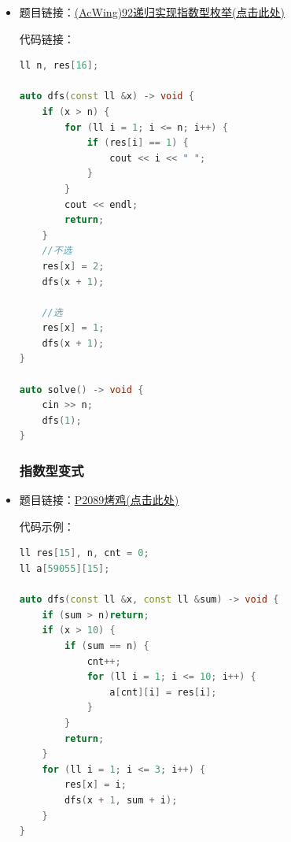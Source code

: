 \begin{itemize}
代码示例：\\
\begin{lstlisting}[language=C++]
ll n, m, res[20];

auto dfs(const ll &x, const ll &start) -> void {
	if (x > m) {
		//这里的x到底是>m还是==m取决于solve中传的x的值，1则>,0则==。
		for (ll i = 1; i <= m; i++) {
			cout << (i > 1 ? " " : "") << res[i];
		}
		cout << endl;
		return; //无论是什么类型的搜索都必须要有return;
	}
	
	for (ll i = start; i <= n; i++) {//因为组合型每次都从当前开始的位置填充，
		res[x] = i;                //所以不需要bool类型的数组        
		dfs(x + 1, start + 1);
	}
}

auto solve() -> void {
	cin >> n >> m;
	dfs(1, 1);
}
\end{lstlisting}
\subsubsection{递归实现指数型枚举}
\item 题目链接：\href{https://www.acwing.com/problem/content/94/}{(AcWing)92递归实现指数型枚举(点击此处)}

代码链接：\\
\begin{lstlisting}[language=C++]
ll n, res[16];

auto dfs(const ll &x) -> void {
	if (x > n) {
		for (ll i = 1; i <= n; i++) {
			if (res[i] == 1) {
				cout << i << " ";
			}
		}
		cout << endl;
		return;
	}
	//不选
	res[x] = 2;
	dfs(x + 1);
	
	//选
	res[x] = 1;
	dfs(x + 1);
}

auto solve() -> void {
	cin >> n;
	dfs(1);
}
\end{lstlisting}
\subsubsection{指数型变式}
\item 题目链接：\href{https://www.luogu.com.cn/problem/P2089}{P2089烤鸡(点击此处)}

代码示例：\\
\begin{lstlisting}[language=C++]
ll res[15], n, cnt = 0;
ll a[59055][15];

auto dfs(const ll &x, const ll &sum) -> void {
	if (sum > n)return;
	if (x > 10) {
		if (sum == n) {
			cnt++;
			for (ll i = 1; i <= 10; i++) {
				a[cnt][i] = res[i];
			}
		}
		return;
	}
	for (ll i = 1; i <= 3; i++) {
		res[x] = i;
		dfs(x + 1, sum + i);
	}
}


\end{lstlisting}
\end{itemize}

